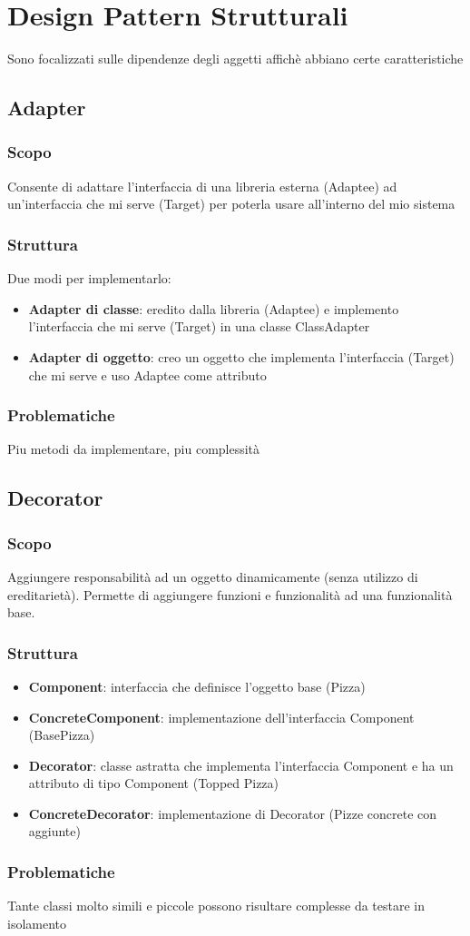 \section{Design Pattern Strutturali}
Sono focalizzati sulle dipendenze degli aggetti affichè abbiano certe
caratteristiche

\subsection{Adapter}
\subsubsection{Scopo}
Consente di adattare l'interfaccia di una libreria esterna (Adaptee) ad
un'interfaccia che mi serve (Target) per poterla usare all'interno del mio
sistema
\subsubsection{Struttura}
Due modi per implementarlo:
\begin{itemize}
    \item \textbf{Adapter di classe}: eredito dalla libreria (Adaptee) e implemento l'interfaccia che mi serve (Target)  in una classe ClassAdapter
    \item \textbf{Adapter di oggetto}: creo un oggetto che implementa l'interfaccia (Target) che mi serve e uso Adaptee come attributo
\end{itemize}
\subsubsection{Problematiche}
Piu metodi da implementare, piu complessità

\subsection{Decorator}
\subsubsection{Scopo}
Aggiungere responsabilità ad un oggetto dinamicamente (senza utilizzo di ereditarietà). Permette di aggiungere funzioni e funzionalità ad una funzionalità base. 
\subsubsection{Struttura}
\begin{itemize}
    \item \textbf{Component}: interfaccia che definisce l'oggetto base (Pizza)
    \item \textbf{ConcreteComponent}: implementazione dell'interfaccia Component (BasePizza)
    \item \textbf{Decorator}: classe astratta che implementa l'interfaccia Component e ha un attributo di tipo Component (Topped Pizza)
    \item \textbf{ConcreteDecorator}: implementazione di Decorator (Pizze concrete con aggiunte)
\end{itemize}
\subsubsection{Problematiche}
Tante classi molto simili e piccole possono risultare complesse da testare in isolamento 